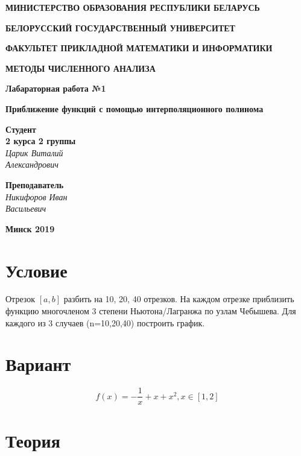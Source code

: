 \documentclass{article}
\begin{document}
\begin{titlepage}



\centerline{\large \bf МИНИСТЕРСТВО ОБРАЗОВАНИЯ РЕСПУБЛИКИ БЕЛАРУСЬ}
\bigskip
\bigskip
\centerline{\large \bf БЕЛОРУССКИЙ ГОСУДАРСТВЕННЫЙ УНИВЕРСИТЕТ}
\bigskip
\bigskip
\centerline{\large \bf ФАКУЛЬТЕТ ПРИКЛАДНОЙ МАТЕМАТИКИ И ИНФОРМАТИКИ}
\vfill
\centerline{\Large \bf МЕТОДЫ ЧИСЛЕННОГО АНАЛИЗА}
\bigskip
\vfill

\centerline{\Large \bf Лабараторная работа №1}
\bigskip
\centerline{\Large \bf Приближение функций с помощью интерполяционного полинома}
\vfill

\hfill
\begin{minipage}{0.25\textwidth}
	{\large{\bf Студент \\ 2 курса 2 группы} \\
		{\it Царик Виталий \\ Александрович }}
\end{minipage}

\vfill
\hfill
\begin{minipage}{0.25\textwidth}
  {\large{\bf Преподаватель} \\
{\it Никифоров Иван \\ Васильевич}}
\end{minipage}
\vfill
\vfill
\centerline{\Large \bf Минск 2019}

\end{titlepage}

\restoregeometry

\section{Условие}
Отрезок $[a, b]$ разбить на 10, 20, 40 отрезков. На каждом отрезке приблизить функцию многочленом 3 степени Ньютона/Лагранжа по узлам Чебышева. Для каждого из 3 случаев (n=10,20,40) построить график.

\section{Вариант}
\begin{equation}
\label{eq:variant}
f(x) = -\frac{1}{x} + x + x^2, x \in [1, 2]
\end{equation}

\section{Теория}
\end{document}
